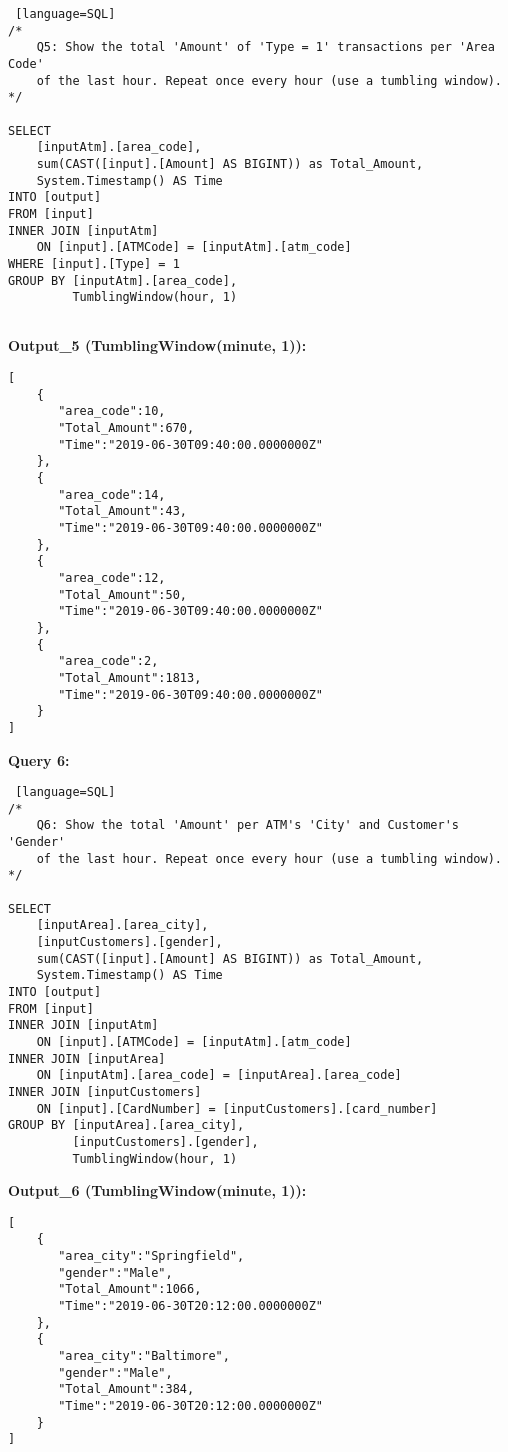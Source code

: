 \documentclass[12pt]{report}
\begin{document}
{\begin{lstlisting} [language=SQL]
/*
    Q5: Show the total 'Amount' of 'Type = 1' transactions per 'Area Code'
    of the last hour. Repeat once every hour (use a tumbling window).
*/

SELECT
    [inputAtm].[area_code],
    sum(CAST([input].[Amount] AS BIGINT)) as Total_Amount, 
    System.Timestamp() AS Time
INTO [output]
FROM [input]
INNER JOIN [inputAtm] 
    ON [input].[ATMCode] = [inputAtm].[atm_code] 
WHERE [input].[Type] = 1
GROUP BY [inputAtm].[area_code],
         TumblingWindow(hour, 1)


\end{lstlisting}

\bigbreak

\noindent \textbf{Output\_5 (TumblingWindow(minute, 1)): }
\begin{lstlisting}
[
	{  
	   "area_code":10,
	   "Total_Amount":670,
	   "Time":"2019-06-30T09:40:00.0000000Z"
	},
	{  
	   "area_code":14,
	   "Total_Amount":43,
	   "Time":"2019-06-30T09:40:00.0000000Z"
	},
	{  
	   "area_code":12,
	   "Total_Amount":50,
	   "Time":"2019-06-30T09:40:00.0000000Z"
	},
	{  
	   "area_code":2,
	   "Total_Amount":1813,
	   "Time":"2019-06-30T09:40:00.0000000Z"
	}
]
\end{lstlisting}


\noindent \textbf{Query 6:}

\begin{lstlisting} [language=SQL]
/*
    Q6: Show the total 'Amount' per ATM's 'City' and Customer's 'Gender' 
    of the last hour. Repeat once every hour (use a tumbling window).
*/

SELECT
    [inputArea].[area_city],
    [inputCustomers].[gender],
    sum(CAST([input].[Amount] AS BIGINT)) as Total_Amount, 
    System.Timestamp() AS Time
INTO [output]
FROM [input]
INNER JOIN [inputAtm]
    ON [input].[ATMCode] = [inputAtm].[atm_code] 
INNER JOIN [inputArea]
    ON [inputAtm].[area_code] = [inputArea].[area_code]
INNER JOIN [inputCustomers]
    ON [input].[CardNumber] = [inputCustomers].[card_number]
GROUP BY [inputArea].[area_city],
         [inputCustomers].[gender], 
         TumblingWindow(hour, 1)

\end{lstlisting}
\bigbreak

\noindent \textbf{Output\_6 (TumblingWindow(minute, 1)):}
\begin{lstlisting}
[
	{  
	   "area_city":"Springfield",
	   "gender":"Male",
	   "Total_Amount":1066,
	   "Time":"2019-06-30T20:12:00.0000000Z"
	},
	{  
	   "area_city":"Baltimore",
	   "gender":"Male",
	   "Total_Amount":384,
	   "Time":"2019-06-30T20:12:00.0000000Z"
	}
]
\end{lstlisting}

}
\end{document}
